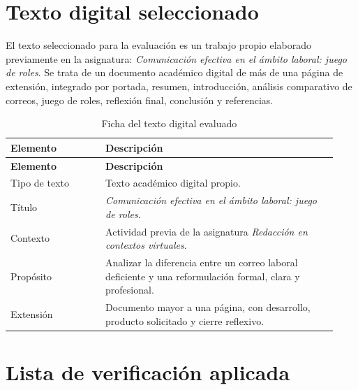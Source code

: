 \documentclass[
	spanish,
	letterpaper, oneside
]{article}
\begin{document}
\section{Texto digital seleccionado}

El texto seleccionado para la evaluación es un trabajo propio elaborado previamente en la asignatura: \textit{Comunicación efectiva en el ámbito laboral: juego de roles}. Se trata de un documento académico digital de más de una página de extensión, integrado por portada, resumen, introducción, análisis comparativo de correos, juego de roles, reflexión final, conclusión y referencias.

\begingroup
\small
\setlength{\tabcolsep}{6pt}
\renewcommand{\arraystretch}{1.28}
\begin{longtable}{@{}L{0.27\linewidth}L{0.66\linewidth}@{}}
\caption{Ficha del texto digital evaluado}\label{tab:ficha-texto}\\
\toprule
\textbf{Elemento} & \textbf{Descripción} \\
\midrule
\endfirsthead
\toprule
\textbf{Elemento} & \textbf{Descripción} \\
\midrule
\endhead
Tipo de texto & Texto académico digital propio. \\
\addlinespace
Título & \textit{Comunicación efectiva en el ámbito laboral: juego de roles}. \\
\addlinespace
Contexto & Actividad previa de la asignatura \textit{Redacción en contextos virtuales}. \\
\addlinespace
Propósito & Analizar la diferencia entre un correo laboral deficiente y una reformulación formal, clara y profesional. \\
\addlinespace
Extensión & Documento mayor a una página, con desarrollo, producto solicitado y cierre reflexivo. \\
\bottomrule
\end{longtable}
\endgroup

\section{Lista de verificación aplicada}
\end{document}
